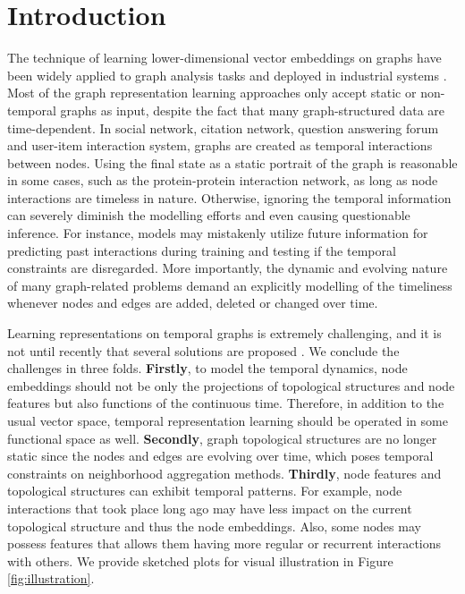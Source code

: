 \documentclass{article} %
\begin{document}
\section{Introduction}
\label{sec:introduction}
The technique of learning lower-dimensional vector embeddings on graphs have been widely applied to graph analysis tasks \citep{perozzi2014deepwalk,tang2015line,wang2016structural} and deployed in industrial systems \citep{ying2018graph,wang2018billion}. Most of the graph representation learning approaches only accept static or non-temporal graphs as input, despite the fact that many graph-structured data are time-dependent.
In social network, citation network, question answering forum and user-item interaction system, graphs are created as temporal interactions between nodes. 
Using the final state as a static portrait of the graph is reasonable in some cases, such as the protein-protein interaction network, as long as node interactions are timeless in nature. Otherwise, ignoring the temporal information can severely diminish the modelling efforts and even causing questionable inference. For instance, models may mistakenly utilize future information for predicting past interactions during training and testing if the temporal constraints are disregarded. More importantly, the dynamic and evolving nature of many graph-related problems demand an explicitly modelling of the timeliness whenever nodes and edges are added, deleted or changed over time.

Learning representations on temporal graphs is extremely challenging, and it is not until recently that several solutions are proposed \citep{nguyen2018continuous,li2018deep,goyal2018dyngem,trivedi2018representation}. We conclude the challenges in three folds. \textbf{Firstly}, to model the temporal dynamics, node embeddings should not be only the projections of topological structures and node features but also functions of the continuous time. Therefore, in addition to the usual vector space, temporal representation learning should be operated in some functional space as well. \textbf{Secondly}, graph topological structures are no longer static since the nodes and edges are evolving over time, which poses temporal constraints on neighborhood aggregation methods. \textbf{Thirdly}, node features and topological structures can exhibit temporal patterns.
For example, node interactions that took place long ago may have less impact on the current topological structure and thus the node embeddings. Also, some nodes may possess features that allows them having more regular or recurrent interactions with others. We provide sketched plots for visual illustration in Figure \ref{fig:illustration}.
\end{document}
